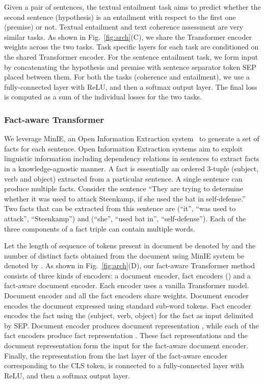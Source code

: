 \documentclass[11pt]{article}
\begin{document}
Given a pair of sentences, the textual entailment task aims to predict whether the second sentence (hypothesis) is an entailment with respect to the first one (premise) or not. Textual entailment and text coherence assessment are very similar tasks. As shown in Fig.~\ref{fig:arch}(C), we share the Transformer encoder weights across the two tasks. Task specific layers for each task are conditioned on the shared Transformer encoder. For the sentence entailment task, we form input by concatenating the hypothesis and premise with sentence separator token SEP placed between them. For both the tasks (coherence and entailment), we use a fully-connected layer with ReLU, and then a softmax output layer. The final loss is computed as a sum of the individual losses for the two tasks. 

\subsubsection{Fact-aware Transformer}
We leverage MinIE, an Open Information Extraction system~\cite{gashteovski2017minie} to generate a set of facts for each sentence. Open Information Extraction systems aim to exploit linguistic information including dependency relations in sentences to extract facts in a knowledge-agnostic manner. A fact is essentially an ordered 3-tuple (subject, verb and object)  extracted from a particular sentence. A single sentence can produce multiple facts. Consider the sentence ``They are trying to determine whether it was used to attack Steenkamp, if she used the bat in self-defense.'' Two facts that can be extracted from this sentence are  (``it'', ``was used to attack'', ``Steenkamp'') and  (``she'', ``used bat in'', ``self-defense''). Each of the three components of a fact triple can contain multiple words. 

Let the length of sequence of tokens present in document  be denoted by  and the number of distinct facts obtained from the document using MinIE system be denoted by . As shown in Fig.~\ref{fig:arch}(D), our fact-aware Transformer method consists of three kinds of encoders: a document encoder,  fact encoders () and a fact-aware document encoder. Each encoder uses a vanilla Transformer model. Document encoder and all the fact encoders share weights. Document encoder encodes the document expressed using standard sub-word tokens. Fact encoder  encodes the  fact using the (subject, verb, object) for the fact as input delimited by SEP. Document encoder produces document representation , while each of the fact encoders  produce fact representation . These fact representations and the document representation form the input for the fact-aware document encoder. Finally, the representation from the last layer of the fact-aware encoder corresponding to the CLS token, is connected to a fully-connected layer with ReLU, and then a softmax output layer. 
\end{document}
